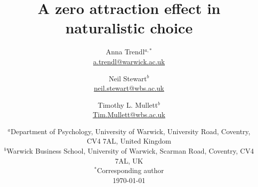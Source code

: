 \documentclass[12pt, a4paper]{article}
\title{}
\author{}
\date{}
\begin{document}
\title{A zero attraction effect in naturalistic choice}

\author{Anna Trendl$^{a,*}$ \\ \href{mailto:a.trendl@warwick.ac.uk}{a.trendl@warwick.ac.uk}\\
 \and Neil Stewart$^b$ \\ 
 \href{mailto:neil.stewart@wbs.ac.uk}{neil.stewart@wbs.ac.uk}
 \\ 
 \and Timothy L. Mullett$^b$ \\
 \href{mailto:Tim.Mullett@wbs.ac.uk}{Tim.Mullett@wbs.ac.uk}
 \\}
 
\date{
    $^a$Department of Psychology, University of Warwick, University Road, Coventry, CV4 7AL, United Kingdom\\
    $^b$Warwick Business School, University of Warwick, Scarman Road, Coventry, CV4 7AL, UK\\
    $^*$Corresponding author\\[2ex]%
    \today
}
\end{document}
